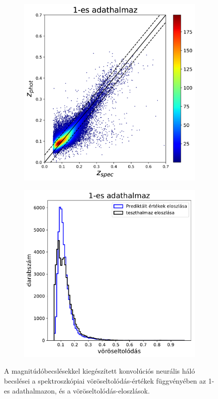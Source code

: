 \documentclass[12pt,letterpaper,twoside,openright]{book}
\begin{document}
\begin{figure}[]
 \centering
  \begin{subfigure}[b]{0.3\textwidth}
    \includegraphics[width=\textwidth, height = \textwidth]{Figures/plotCNN1M.png}
    \label{fig:1}
  \end{subfigure}
  \hspace{1.7cm}
  \begin{subfigure}[b]{0.3\textwidth}
    \includegraphics[width=\textwidth, height = \textwidth]{Figures/histCNN1M.pdf}
    \label{fig:2}
  \end{subfigure}
  \caption{A magnitúdóbecslésekkel kiegészített konvolúciós neurális háló becslései a spektroszkópiai vöröseltolódás-értékek függvényében az 1-es adathalmazon, és a vöröseltolódás-eloszlások.}
\label{cnnm}
\end{figure}
\end{document}
